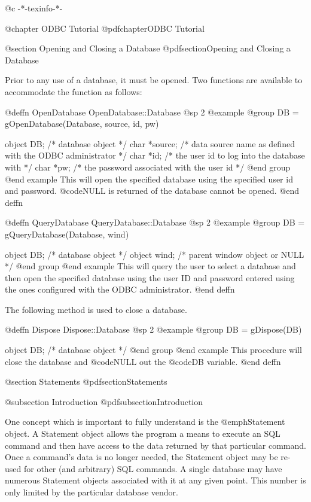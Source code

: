 @c -*-texinfo-*-

@chapter ODBC Tutorial
@pdfchapter{ODBC Tutorial}

@section Opening and Closing a Database
@pdfsection{Opening and Closing a Database}

Prior to any use of a database, it must be opened.  Two functions are
available to accommodate the function as follows:

@deffn {OpenDatabase} OpenDatabase::Database
@sp 2
@example
@group
DB = gOpenDatabase(Database, source, id, pw)

object  DB;             /*  database object  */
char    *source;        /*  data source name as defined with
                            the ODBC administrator  */
char    *id;            /*  the user id to log into the
                            database with  */
char    *pw;            /*  the password associated with
                            the user id   */
@end group
@end example
This will open the specified database using the specified user id and password.
@code{NULL} is returned of the database cannot be opened.
@end deffn

@deffn {QueryDatabase} QueryDatabase::Database
@sp 2
@example
@group
DB = gQueryDatabase(Database, wind)

object  DB;             /*  database object  */
object  wind;           /*  parent window object or NULL  */
@end group
@end example
This will query the user to select a database and then open the specified database
using the user ID and password entered using the ones configured with the ODBC administrator.
@end deffn

The following method is used to close a database.

@deffn {Dispose}  Dispose::Database
@sp 2
@example
@group
DB = gDispose(DB)

object  DB;             /*  database object  */
@end group
@end example
This procedure will close the database and @code{NULL} out the @code{DB} variable.
@end deffn




@section Statements
@pdfsection{Statements}

@subsection Introduction
@pdfsubsection{Introduction}

One concept which is important to fully understand is the
@emph{Statement} object.  A Statement object allows the program a means
to execute an SQL command and then have access to the data returned by
that particular command.  Once a command's data is no longer needed, the
Statement object may be re-used for other (and arbitrary) SQL commands.
A single database may have numerous Statement objects associated with it
at any given point.  This number is only limited by the particular
database vendor.

